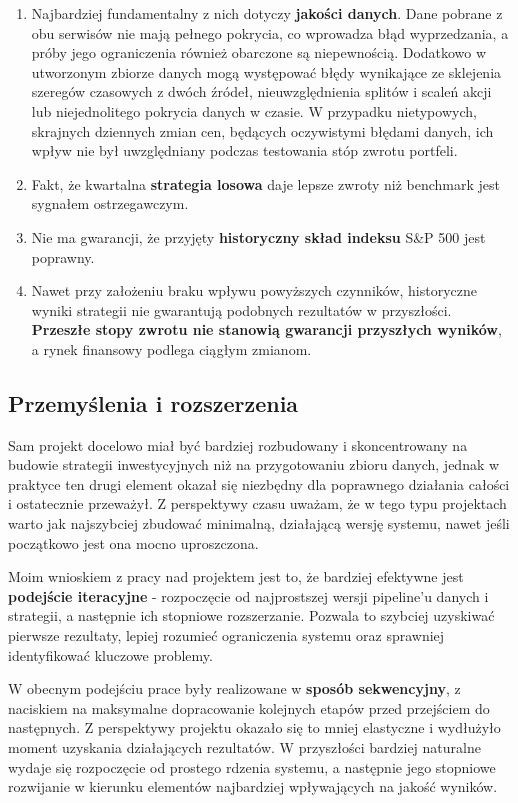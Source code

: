 \documentclass[12pt, a4paper]{article}
\begin{document}
\begin{enumerate}
    \item Najbardziej fundamentalny z nich dotyczy \textbf{jakości danych}. Dane pobrane z obu serwisów nie mają pełnego pokrycia, co wprowadza błąd wyprzedzania, a próby jego ograniczenia również obarczone są niepewnością. Dodatkowo w utworzonym zbiorze danych mogą występować błędy wynikające ze sklejenia szeregów czasowych z dwóch źródeł, nieuwzględnienia splitów i scaleń akcji lub niejednolitego pokrycia danych w czasie. W przypadku nietypowych, skrajnych dziennych zmian cen, będących oczywistymi błędami danych, ich wpływ nie był uwzględniany podczas testowania stóp zwrotu portfeli.
    \item Fakt, że kwartalna \textbf{strategia losowa} daje lepsze zwroty niż benchmark jest sygnałem ostrzegawczym.
    \item Nie ma gwarancji, że przyjęty \textbf{historyczny skład indeksu} S\&P 500 jest poprawny.
    \item Nawet przy założeniu braku wpływu powyższych czynników, historyczne wyniki strategii nie gwarantują podobnych rezultatów w przyszłości. \textbf{Przeszłe stopy zwrotu nie stanowią gwarancji przyszłych wyników}, a rynek finansowy podlega ciągłym zmianom.
\end{enumerate}

\subsection{Przemyślenia i rozszerzenia}

Sam projekt docelowo miał być bardziej rozbudowany i skoncentrowany na budowie strategii inwestycyjnych niż na przygotowaniu zbioru danych, jednak w praktyce ten drugi element okazał się niezbędny dla poprawnego działania całości i ostatecznie przeważył. Z perspektywy czasu uważam, że w tego typu projektach warto jak najszybciej zbudować minimalną, działającą wersję systemu, nawet jeśli początkowo jest ona mocno uproszczona.

Moim wnioskiem z pracy nad projektem jest to, że bardziej efektywne jest \textbf{podejście iteracyjne} - rozpoczęcie od najprostszej wersji pipeline’u danych i strategii, a następnie ich stopniowe rozszerzanie. Pozwala to szybciej uzyskiwać pierwsze rezultaty, lepiej rozumieć ograniczenia systemu oraz sprawniej identyfikować kluczowe problemy.

W obecnym podejściu prace były realizowane w \textbf{sposób sekwencyjny}, z naciskiem na maksymalne dopracowanie kolejnych etapów przed przejściem do następnych. Z perspektywy projektu okazało się to mniej elastyczne i wydłużyło moment uzyskania działających rezultatów. W przyszłości bardziej naturalne wydaje się rozpoczęcie od prostego rdzenia systemu, a następnie jego stopniowe rozwijanie w kierunku elementów najbardziej wpływających na jakość wyników.
\end{document}
